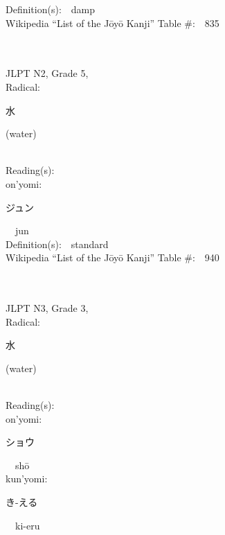 \begin{multicols}{2}
Definition(s):\ \ damp \\
Wikipedia ``List of the J\=oy\=o Kanji'' Table \#:\ \ 835 \\
\ \ \\
{\fontsize{34pt}{40pt}  }\ \ \\  %
{JLPT N2, Grade 5, \\Radical:\ \ {\begin{CJK}{UTF8}{min} 水 \end{CJK}} (water) } \\
Reading(s):\ \ \\
{\hspace*{1em}}on'yomi:\ \ \\
{\hspace*{2em}}{\begin{CJK}{UTF8}{min} ジュン \end{CJK}}\ \ jun\ \ \\
Definition(s):\ \ standard \\
Wikipedia ``List of the J\=oy\=o Kanji'' Table \#:\ \ 940 \\
\ \ \\
{\fontsize{34pt}{40pt}  }\ \ \\  %
{JLPT N3, Grade 3, \\Radical:\ \ {\begin{CJK}{UTF8}{min} 水 \end{CJK}} (water) } \\
Reading(s):\ \ \\
{\hspace*{1em}}on'yomi:\ \ \\
{\hspace*{2em}}{\begin{CJK}{UTF8}{min} ショウ \end{CJK}}\ \ sh\=o\ \ \\
{\hspace*{1em}}kun'yomi:\ \ \\
{\hspace*{2em}}{\begin{CJK}{UTF8}{min} き-える \end{CJK}}\ \ ki-eru\ \ \\

\end{multicols}

